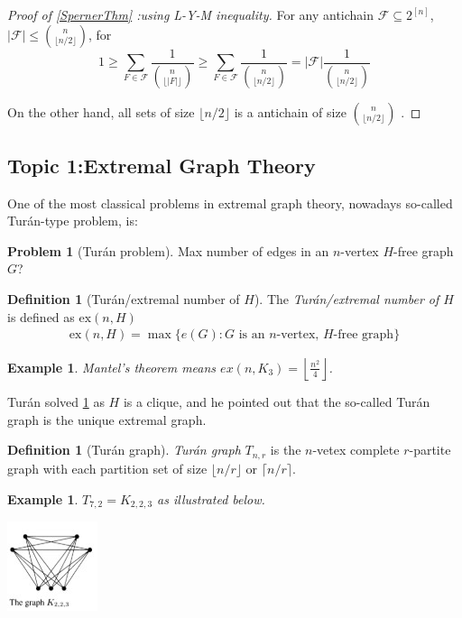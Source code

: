 \documentclass{article}
\newtheorem{example}[theorem]{Example}
\theoremstyle{definition}
\newtheorem{definition}[theorem]{Definition}
\newtheorem{problem}[theorem]{Problem}
\newcommand{\ex}{\mathrm{ex}}
\def\Turan{Tur\'an}
\begin{document}
\begin{proof}[Proof of \ref{SpernerThm}
:using L-Y-M inequality]
    For any antichain $\mathcal{F}\subseteq 2^{[n]}$,
    $\left | \mathcal{F} \right | \le \binom{n}{\lfloor n/2\rfloor}$, for
    $$1 \ge \sum_{F \in \mathcal{F}}\frac{1}{\binom{n}{\lfloor \left | F \right | \rfloor}} \ge \sum_{F \in \mathcal{F}}\frac{1}{\binom{n}{\lfloor n/2\rfloor}}
    = \left | \mathcal{F} \right |\frac{1}{\binom{n}{\lfloor n/2\rfloor}} $$

    On the other hand, all sets of size $\lfloor n/2\rfloor$ is a antichain of size $\binom{n}{\lfloor n/2\rfloor}$ .
\end{proof}

\subsection{Topic 1:Extremal Graph Theory}

One of the most classical problems in extremal graph theory, nowadays so-called \Turan{}-type problem, is:

\begin{problem}[\Turan{} problem]\label{TuranProblem}
    Max number of edges in an $n$-vertex $H$-free graph $G$?
\end{problem}

\begin{definition} [\Turan{}/extremal number of $H$] 
    The \emph{\Turan{}/extremal number of $H$} is defined as $\ex(n,H)$
    \begin{align*}
        \ex(n,H)=\max\{e(G): G \text{ is an $n$-vertex, $H$-free graph}\}
    \end{align*}
\end{definition}

\begin{example}
    Mantel's theorem means $ex(n,K_3)=\left \lfloor 
    \frac{n^2}{4} \right \rfloor$.
\end{example}

\Turan{} solved \ref{TuranProblem} as $H$ is a clique, and he pointed out that the so-called \Turan{} graph is the unique extremal graph.

\begin{definition}[\Turan{} graph]
   \emph{\Turan{} graph} $T_{n,r}$ is the $n$-vetex complete $r$-partite graph with each partition set of size $\lfloor n/r \rfloor$ or $\lceil n/r\rceil$. 
\end{definition}

\begin{example}
    $T_{7,2}=K_{2,2,3}$ as illustrated below.
    \begin{center}
        \includegraphics[scale=1.5]{2-4.jpg}
    \end{center}
\end{example}
\end{document}
